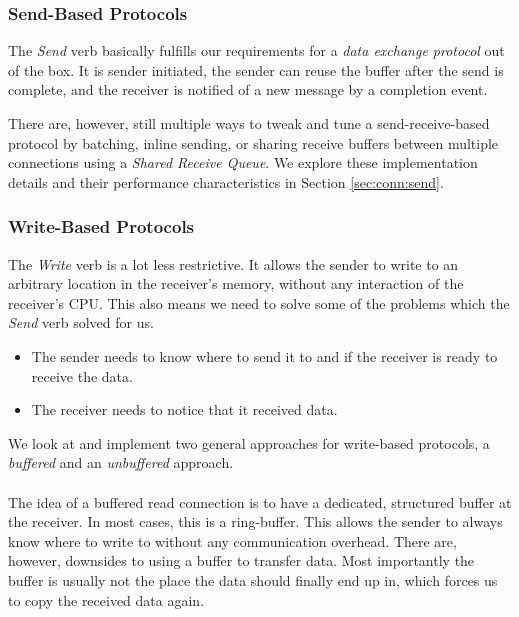 \subsubsection{Send-Based Protocols}
The \emph{Send} verb basically fulfills our requirements for a \emph{data exchange protocol} out of the box. It is sender
initiated, the sender can reuse the buffer after the send is complete, and the receiver is notified of a new message by
a completion event.

There are, however, still multiple ways to tweak and tune a send-receive-based protocol by batching, inline sending, or 
sharing receive buffers between multiple connections using a \emph{Shared Receive Queue}. We explore these implementation 
details and their performance characteristics in Section \ref{sec:conn:send}.

\subsubsection{Write-Based Protocols}
The \emph{Write} verb is a lot less restrictive. It allows the sender to write to an arbitrary 
location in the receiver's memory, without any interaction of the receiver's CPU. 
This also means we need to solve some of the 
problems which the \emph{Send} verb solved for us.

\begin{itemize}
  \item The sender needs to know where to send it to and if the receiver is ready to receive the data.

  \item The receiver needs to notice that it received data.
\end{itemize}

We look at and implement two general approaches for write-based protocols, a \emph{buffered} and an \emph{unbuffered} approach.

\paragraph{} The idea of a buffered read connection is to have a dedicated, structured buffer at the receiver. In most cases, 
this is a ring-buffer. This allows the sender to always know where to write to without any communication overhead. There 
are, however, downsides to using a buffer to transfer data. Most importantly the buffer is usually not the place the 
data should finally end up in, which forces us to copy the received data again.


